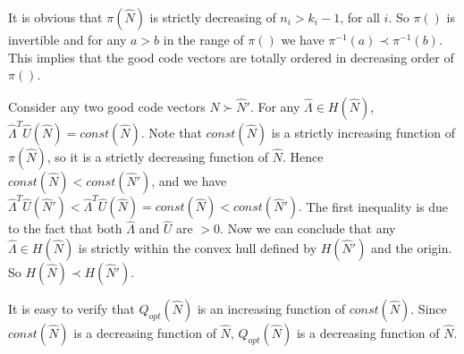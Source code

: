 \documentclass[journal]{IEEEtran}
\newcommand{\rateVec}{\hat{\Lambda}}
\newcommand{\codeVec}{\hat{N}}
\newcommand{\usageVec}{\hat{U}}
\begin{document}
\begin{IEEEproof}
It is obvious that $\pi(\codeVec)$ is strictly decreasing of $n_i>k_i-1$, for all $i$. So $\pi()$ is invertible and for any $a > b$ in the range of $\pi()$ we have
$
\pi^{-1}(a)\prec \pi^{-1}(b).
$
This implies that the good code vectors are totally ordered in  decreasing order of $\pi()$. 

Consider any two good code vectors $\codeVec \succ \codeVec'$. For any $\rateVec\in H(\codeVec)$, $\rateVec^T\usageVec(\codeVec) = const(\codeVec)$. 
Note that $const(\codeVec)$ is a strictly increasing function of $\pi(\codeVec)$, so it is a strictly decreasing function of $\codeVec$. Hence $const(\codeVec)<const(\codeVec')$, and we have
$
\rateVec^T\usageVec(\codeVec')  < \rateVec^T\usageVec(\codeVec)
= const(\codeVec)
< const(\codeVec').
$
The first inequality is due to the fact that both $\rateVec$ and $\usageVec$ are $>0$. Now we can conclude that any $\rateVec\in H(\codeVec)$ is strictly within the convex hull defined by $H(\codeVec')$ and the origin. So $H(\codeVec)\prec H(\codeVec')$.

It is easy to verify that $Q_{opt}(\codeVec)$ is an increasing function of $const(\codeVec)$. Since $const(\codeVec)$ is a decreasing function of $\codeVec$, $Q_{opt}(\codeVec)$ is a decreasing function of $\codeVec$. 
\end{IEEEproof}
\end{document}

